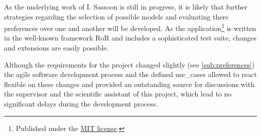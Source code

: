 As the underlying work of I. Sassoon \cite{sassoon2016CD} is still in progress, it is likely that further strategies regarding the selection of possible models and evaluating there preferences over one and another will be developed. As the application\footnote{Published under the \href{https://opensource.org/licenses/MIT}{MIT license}.} is written in the well-known framework \gls{RoR} and includes a sophisticated test suite, changes and extensions are easily possible.
 
Although the requirements for the project changed slightly (see \autoref{sub:preferences}) the agile software development process and the defined \glspl{use_case} allowed to react flexible on these changes and provided an outstanding source for discussions with the supervisor and the scientific assistant of this project, which lead to no significant delays during the development process.